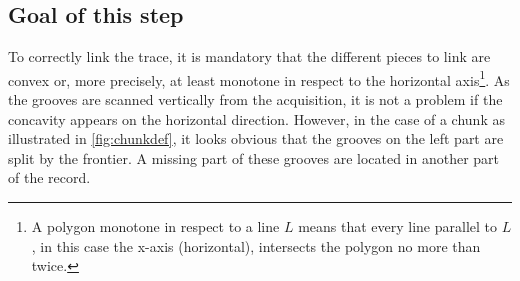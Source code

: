 \subsection{Goal of this step}
\label{chap:linking}

To correctly link the trace, it is mandatory that the different pieces to link are convex or, more precisely, at least monotone in respect to the horizontal axis\footnote{A polygon monotone in respect to a line $L$ means that every line parallel to $L$, in this case the x-axis (horizontal), intersects the polygon no more than twice.}. As the grooves are scanned vertically from the acquisition, it is not a problem if the concavity appears on the horizontal direction. However, in the case of a chunk as illustrated in \autoref{fig:chunkdef}, it looks obvious that the grooves on the left part are split by the frontier. A missing part of these grooves are located in another part of the record.

